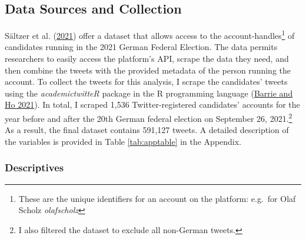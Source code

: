 \documentclass[a4paper,11pt]{article}
\begin{document}
\hypertarget{data-sources-and-collection}{%
\subsection{Data Sources and Collection}\label{data-sources-and-collection}}

Sältzer et al. (\protect\hyperlink{ref-saltzerTwitterAccountsCandidates2021}{2021}) offer a dataset that allows access to the account-handles\footnote{These are the unique identifiers for an account on the platform: e.g.~for Olaf Scholz \emph{olafscholz}} of candidates running in the 2021 German Federal Election. The data permits researchers to easily access the platform's API, scrape the data they need, and then combine the tweets with the provided metadata of the person running the account. To collect the tweets for this analysis, I scrape the candidates' tweets using the \emph{academictwitteR} package in the R programming language (\protect\hyperlink{ref-barrieAcademictwitteRPackageAccess2021}{Barrie and Ho 2021}).
In total, I scraped 1,536 Twitter-registered candidates' accounts for the year before and after the 20th German federal election on September 26, 2021.\footnote{I also filtered the dataset to exclude all non-German tweets.} As a result, the final dataset contains 591,127 tweets. A detailed description of the variables is provided in Table \ref{tab:apptable} in the Appendix.

\hypertarget{descriptives}{%
\subsubsection{Descriptives}\label{descriptives}}
\end{document}
